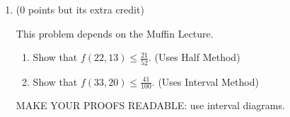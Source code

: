 \documentclass[12pt]{article}
\begin{document}
\begin{enumerate}
\begin{enumerate}
\end{enumerate}

\item
(0 points but its extra credit)

This problem depends on the Muffin Lecture. 

\begin{enumerate}
\item
Show that $f(22,13)\le \frac{21}{52}$. 
(Uses Half Method)
\item
Show that $f(33,20)\le \frac{41}{100}$. 
(Uses Interval Method) 
\end{enumerate}

MAKE YOUR PROOFS READABLE: use interval diagrams. 

\end{enumerate}
\end{document}
